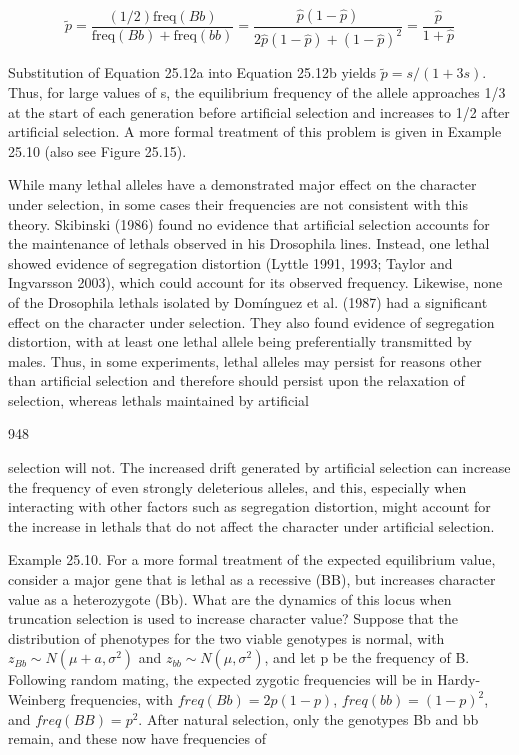 \documentclass{article}
\begin{document}
\begin{equation}
\widetilde{p}=\frac{(1/2)\mathrm{freq}(Bb)}{\mathrm{freq}(Bb)+\mathrm{freq}(bb)}=\frac{\widehat{p}(1-\widehat{p})}{2\widehat{p}(1-\widehat{p})+(1-\widehat{p})^{2}}=\frac{\widehat{p}}{1+\widehat{p}}
\tag{25.12b}
\label{eq:25_12b}
\end{equation}

Substitution of Equation 25.12a into Equation 25.12b yields  $ \widetilde{p} = s/(1 + 3s) $. Thus, for large values of s, the equilibrium frequency of the allele approaches 1/3 at the start of each generation before artificial selection and increases to 1/2 after artificial selection. A more formal treatment of this problem is given in Example 25.10 (also see Figure 25.15).

While many lethal alleles have a demonstrated major effect on the character under selection, in some cases their frequencies are not consistent with this theory. Skibinski (1986) found no evidence that artificial selection accounts for the maintenance of lethals observed in his Drosophila lines. Instead, one lethal showed evidence of segregation distortion (Lyttle 1991, 1993; Taylor and Ingvarsson 2003), which could account for its observed frequency. Likewise, none of the Drosophila lethals isolated by Domínguez et al. (1987) had a significant effect on the character under selection. They also found evidence of segregation distortion, with at least one lethal allele being preferentially transmitted by males. Thus, in some experiments, lethal alleles may persist for reasons other than artificial selection and therefore should persist upon the relaxation of selection, whereas lethals maintained by artificial

948

selection will not. The increased drift generated by artificial selection can increase the frequency of even strongly deleterious alleles, and this, especially when interacting with other factors such as segregation distortion, might account for the increase in lethals that do not affect the character under artificial selection.

Example 25.10. For a more formal treatment of the expected equilibrium value, consider a major gene that is lethal as a recessive (BB), but increases character value as a heterozygote (Bb). What are the dynamics of this locus when truncation selection is used to increase character value? Suppose that the distribution of phenotypes for the two viable genotypes is normal, with  $ z_{Bb} \sim N(\mu + a, \sigma^2) $ and  $ z_{bb} \sim N(\mu, \sigma^2) $, and let p be the frequency of B. Following random mating, the expected zygotic frequencies will be in Hardy-Weinberg frequencies, with  $ freq(Bb) = 2p(1 - p) $,  $ freq(bb) = (1 - p)^2 $, and  $ freq(BB) = p^2 $. After natural selection, only the genotypes Bb and bb remain, and these now have frequencies of
\end{document}
